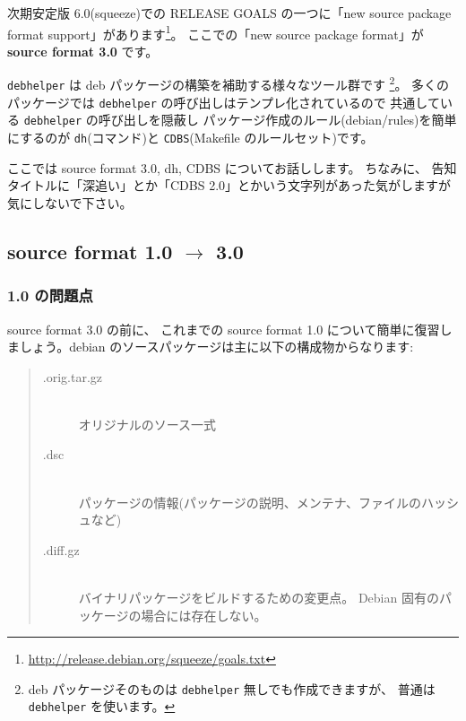 \documentclass[mingoth,a4paper]{jsarticle}
\begin{document}

次期安定版 6.0(squeeze)での RELEASE GOALS の一つに「new source package format support」があります\footnote{\url{http://release.debian.org/squeeze/goals.txt}}。
ここでの「new source package format」が {\bf source format 3.0} です。
\vspace{1em}

{\tt debhelper} は deb パッケージの構築を補助する様々なツール群です%
\footnote{%
deb パッケージそのものは {\tt debhelper} 無しでも作成できますが、
普通は {\tt debhelper} を使います。}。
多くのパッケージでは {\tt debhelper} の呼び出しはテンプレ化されているので
共通している {\tt debhelper} の呼び出しを隠蔽し
パッケージ作成のルール(debian/rules)を簡単にするのが
{\tt dh}(コマンド)と {\tt CDBS}(Makefile のルールセット)です。
\vspace{1em}

ここでは source format 3.0, dh, CDBS についてお話しします。
ちなみに、
告知タイトルに「深追い」とか「CDBS 2.0」とかいう文字列があった気がしますが
気にしないで下さい。

\subsection{source format 1.0 $\to$ 3.0 }

\subsubsection{1.0 の問題点}

source format 3.0 の前に、
これまでの source format 1.0 について簡単に復習しましょう。debian のソースパッケージは主に以下の構成物からなります:
\begin{quote}
    \begin{screen}
        \begin{description}
              \item[.orig.tar.gz] 　\\
            オリジナルのソース一式
              \item[.dsc]　\\
            パッケージの情報(パッケージの説明、メンテナ、ファイルのハッシュなど)
              \item[.diff.gz]　\\
            バイナリパッケージをビルドするための変更点。
            Debian 固有のパッケージの場合には存在しない。
        \end{description}
    \end{screen}
\end{quote}
\end{document}
